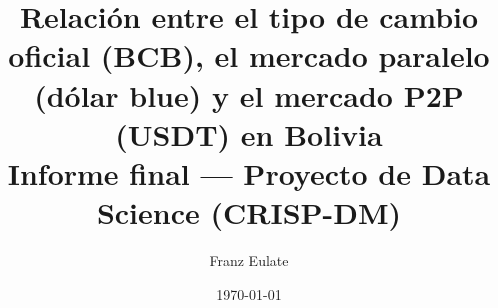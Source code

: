 \documentclass[11pt,a4paper]{article}
\title{Relación entre el tipo de cambio oficial (BCB), el mercado
       paralelo (dólar blue) y el mercado P2P (USDT) en Bolivia\\[0.5em]
       \large Informe final --- Proyecto de Data Science (CRISP-DM)}
\author{Franz Eulate}
\date{\today}
\begin{document}
\maketitle

\begin{abstract}
\noindent

\end{abstract}








\footnotesize

\end{document}

